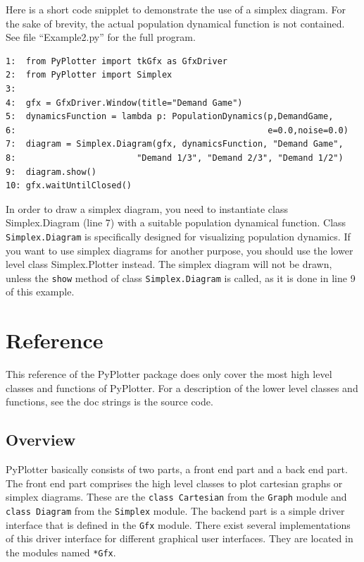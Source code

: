\documentclass[12pt,a4paper,USenglish]{article}
\begin{document}
Here is a short code snipplet to demonstrate the use of a simplex diagram.
For the sake of brevity, the actual population dynamical function is
not contained. See file ``Example2.py'' for the full program.

\begin{verbatim}
1:  from PyPlotter import tkGfx as GfxDriver
2:  from PyPlotter import Simplex
3:
4:  gfx = GfxDriver.Window(title="Demand Game")   
5:  dynamicsFunction = lambda p: PopulationDynamics(p,DemandGame, 
6:                                                  e=0.0,noise=0.0)
7:  diagram = Simplex.Diagram(gfx, dynamicsFunction, "Demand Game",
8:                        "Demand 1/3", "Demand 2/3", "Demand 1/2")
9:  diagram.show()
10: gfx.waitUntilClosed()
\end{verbatim}

In order to draw a simplex diagram, you need to instantiate class
Simplex.Diagram (line 7) with a suitable population dynamical
function. Class {\tt Simplex.Diagram} is specifically designed for
visualizing population dynamics. If you want to use simplex diagrams
for another purpose, you should use the lower level class
Simplex.Plotter instead. The simplex diagram will not be drawn, unless
the {\tt show} method of class {\tt Simplex.Diagram} is called, as it
is done in line 9 of this example.

\section{Reference}

This reference of the {\sf PyPlotter} package does only cover the most high
level classes and functions of {\sf PyPlotter}. For a description of the
lower level classes and functions, see the doc strings is the source
code.

\subsection{Overview}

{\sf PyPlotter} basically consists of two parts, a front end part and
a back end part. The front end part comprises the high level classes
to plot cartesian graphs or simplex diagrams. These are the {\tt class
Cartesian} from the {\tt Graph} module and {\tt class Diagram} from
the {\tt Simplex} module. The backend part is a simple driver
interface that is defined in the {\tt Gfx} module. There exist several
implementations of this driver interface for different graphical user
interfaces. They are located in the modules named {\tt **Gfx}.
\end{document}
